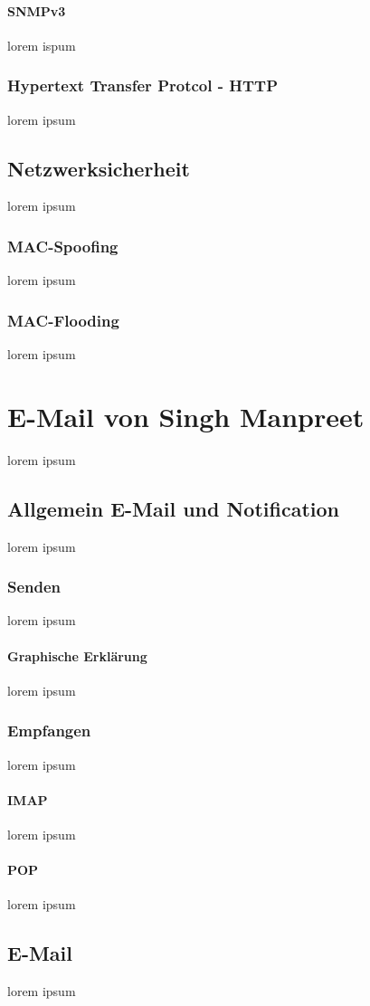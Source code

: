 \documentclass[11pt,a4paper]{report}
\begin{document}
\subsubsection{SNMPv3}
lorem ispum
\subsection{Hypertext Transfer Protcol - HTTP}
lorem ipsum
\section{Netzwerksicherheit}
lorem ipsum
\subsection{MAC-Spoofing}\label{ssec:mspoof}
lorem ipsum
\subsection{MAC-Flooding}\label{ssec:mflood}
lorem ipsum

\chapter{E-Mail von Singh Manpreet}
lorem ipsum
\section{Allgemein E-Mail und Notification}
lorem ipsum
\subsection{Senden}
lorem ipsum
\subsubsection{Graphische Erklärung}
lorem ipsum
\subsection{Empfangen}
lorem ipsum
\subsubsection{IMAP}
lorem ipsum
\subsubsection{POP}
lorem ipsum
\section{E-Mail}
lorem ipsum
\end{document}
